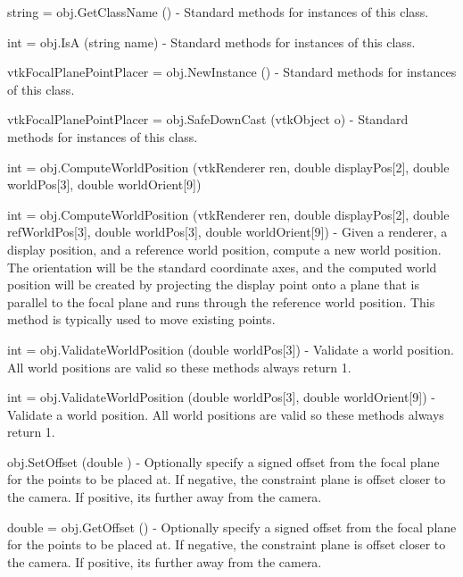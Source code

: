 \begin{DoxyItemize}
\item {\ttfamily string = obj.\-Get\-Class\-Name ()} -\/ Standard methods for instances of this class.  
\item {\ttfamily int = obj.\-Is\-A (string name)} -\/ Standard methods for instances of this class.  
\item {\ttfamily vtk\-Focal\-Plane\-Point\-Placer = obj.\-New\-Instance ()} -\/ Standard methods for instances of this class.  
\item {\ttfamily vtk\-Focal\-Plane\-Point\-Placer = obj.\-Safe\-Down\-Cast (vtk\-Object o)} -\/ Standard methods for instances of this class.  
\item {\ttfamily int = obj.\-Compute\-World\-Position (vtk\-Renderer ren, double display\-Pos\mbox{[}2\mbox{]}, double world\-Pos\mbox{[}3\mbox{]}, double world\-Orient\mbox{[}9\mbox{]})}  
\item {\ttfamily int = obj.\-Compute\-World\-Position (vtk\-Renderer ren, double display\-Pos\mbox{[}2\mbox{]}, double ref\-World\-Pos\mbox{[}3\mbox{]}, double world\-Pos\mbox{[}3\mbox{]}, double world\-Orient\mbox{[}9\mbox{]})} -\/ Given a renderer, a display position, and a reference world position, compute a new world position. The orientation will be the standard coordinate axes, and the computed world position will be created by projecting the display point onto a plane that is parallel to the focal plane and runs through the reference world position. This method is typically used to move existing points.  
\item {\ttfamily int = obj.\-Validate\-World\-Position (double world\-Pos\mbox{[}3\mbox{]})} -\/ Validate a world position. All world positions are valid so these methods always return 1.  
\item {\ttfamily int = obj.\-Validate\-World\-Position (double world\-Pos\mbox{[}3\mbox{]}, double world\-Orient\mbox{[}9\mbox{]})} -\/ Validate a world position. All world positions are valid so these methods always return 1.  
\item {\ttfamily obj.\-Set\-Offset (double )} -\/ Optionally specify a signed offset from the focal plane for the points to be placed at. If negative, the constraint plane is offset closer to the camera. If positive, its further away from the camera.  
\item {\ttfamily double = obj.\-Get\-Offset ()} -\/ Optionally specify a signed offset from the focal plane for the points to be placed at. If negative, the constraint plane is offset closer to the camera. If positive, its further away from the camera.  

\end{DoxyItemize}
